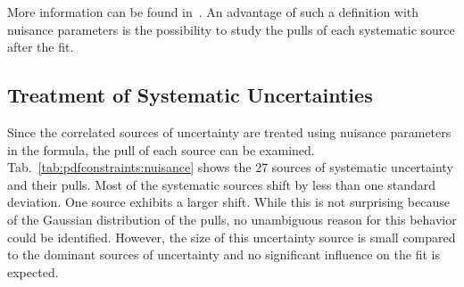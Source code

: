More information can be found in~\cite{Alekhin:2014irh,Abramowicz:2015mha}. An
advantage of such a \chisq definition with nuisance parameters is the
possibility to study the pulls of each systematic source after the fit.

\subsection{Treatment of Systematic Uncertainties}
\label{section:cmsdatauncertainties}

Since the correlated sources of uncertainty are treated using nuisance
parameters in the \chisq formula, the pull of each source can be examined.
Tab.~\ref{tab:pdfconstraints:nuisance} shows the 27 sources of systematic
uncertainty and their pulls. Most of the systematic sources shift by less than
one standard deviation. One source exhibits a larger shift. While this is not
surprising because of the Gaussian distribution of the pulls, no unambiguous
reason for this behavior could be identified. However, the size of this
uncertainty source is small compared to the dominant sources of
uncertainty and no significant influence on the fit is expected.

